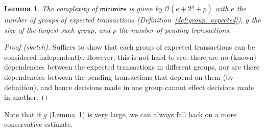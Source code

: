 \documentclass{article}
\newcommand{\order}[1]{\mathcal{O}\left(#1\right)}
\newtheorem{lemma}{Lemma}
\begin{document}
\begin{lemma}
The complexity of $\mathsf{minimize}$ is given by
\begin{math}
\order{e + 2^g + p}
\end{math}
with $e$ the number of groups of expected transactions
(Definition~\ref{def:group_expected}), $g$ the size of the largest such group,
and $p$ the number of pending transactions.
\label{lem:complexity_minimize}
\end{lemma}

\begin{proof}[Proof (sketch)]
Suffices to show that each group of expected transactions can be considered
independently. However, this is not hard to see: there are no (known)
dependencies between the expected transactions in different groups, nor are
there dependencies between the pending transactions that depend on them (by
definition), and hence decisions made in one group cannot effect decisions made
in another.
\end{proof}

Note that if $g$ (Lemma~\ref{lem:complexity_minimize}) is very large, we can
always fall back on a more conservative estimate.
\end{document}
